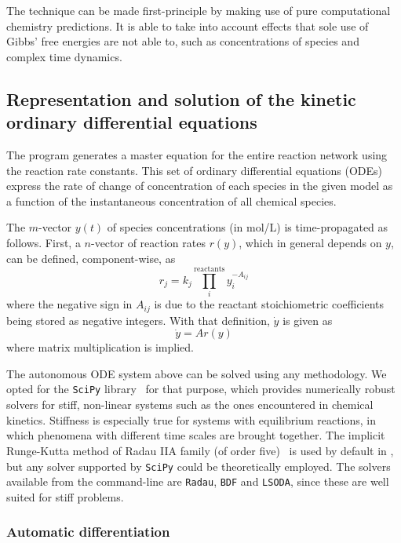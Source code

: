 The technique can be made first-principle by making use of pure computational
chemistry predictions.
It is able to take into account effects that sole use of Gibbs' free energies
are not able to,
such as concentrations of species and complex time dynamics.

\subsection{Representation and solution of the kinetic ordinary differential equations}

The program generates a master equation for the entire reaction network using the reaction rate constants.
This set of ordinary differential equations (ODEs) express the rate of change of concentration of each species in the given model as a function of the instantaneous concentration of all chemical species.

The $m$-vector $y(t)$ of species concentrations (in mol/L) is time-propagated as follows.
First,
a $n$-vector of reaction rates $r(y)$,
which in general depends on $y$,
can be defined,
component-wise,
as
% 
\begin{equation}
	r_j
	= k_j \prod_i^\text{reactants}
	y_i^{-A_{ij}}
\end{equation}
% 
where the negative sign in $A_{ij}$ is due to the reactant stoichiometric coefficients being stored as negative integers.
With that definition,
$\dot{y}$ is given as
% 
\begin{equation}
	\dot{y} = A r(y)
\end{equation}
% 
where matrix multiplication is implied.

The autonomous ODE system above can be solved using any methodology.
We opted for the \texttt{SciPy} library~\cite{Virtanen_2020} for that purpose,
which provides numerically robust solvers for stiff,
non-linear systems such as the ones encountered in chemical kinetics.
Stiffness is especially true for systems with equilibrium reactions,
in which phenomena with different time scales are brought together.
The implicit Runge-Kutta method of Radau IIA family (of order five)~\cite{Hairer_1996} is used by default in \overreact,
but any solver supported by \texttt{SciPy} could be theoretically employed.
The solvers available from the command-line are \texttt{Radau},
\texttt{BDF} and \texttt{LSODA},
since these are well suited for stiff problems.

\subsubsection{Automatic differentiation}

